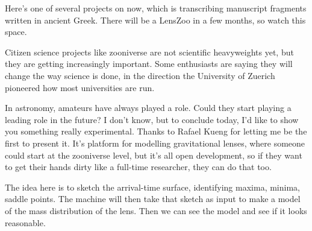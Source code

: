 \next

Here's one of several projects on now, which is transcribing
manuscript fragments written in ancient Greek.  There will be a
LensZoo in a few months, so watch this space.

Citizen science projects like zooniverse are not scientific
heavyweights yet, but they are getting increasingly important.  Some
enthusiasts are saying they will change the way science is done, in
the direction the University of Zuerich pioneered how most
universities are run.

In astronomy, amateurs have always played a role.  Could they start
playing a leading role in the future?  I don't know, but to conclude
today, I'd like to show you something really experimental.  Thanks to
Rafael Kueng for letting me be the first to present it.  It's platform
for modelling gravitational lenses, where someone could start at the
zooniverse level, but it's all open development, so if they want to
get their hands dirty like a full-time researcher, they can do that
too.

\next

The idea here is to sketch the arrival-time surface, identifying
maxima, minima, saddle points.  The machine will then take that sketch
as input to make a model of the mass distribution of the lens.  Then
we can see the model and see if it looks reasonable.

\bye
